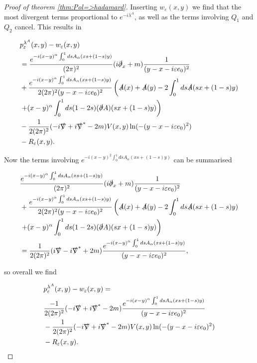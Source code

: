 \documentclass[b5paper,draft,openbib,12pt]{memoir}
\begin{document}
\begin{proof}[Proof of theorem \ref{thm:Pol=>hadamard}]
Inserting \(w_\varepsilon(x,y)\) we find that the most divergent terms proportional to \(e^{-i\lambda^A}\), as well as the terms involving \(Q_1\) and \(Q_2\) cancel.
This results in 

\begin{align*}
&p_\varepsilon^{\lambda^A}(x,y)-w_\varepsilon(x,y)\\
&=\frac{e^{-i(x-y)^\alpha \int_0^1 ds A_\alpha (xs + (1-s)y)}}{(2\pi)^2}(i\slashed{\partial}_x+m)\frac{1}{(y-x-i\varepsilon e_0)^2}\\
&+\frac{e^{-i (x-y)^\alpha\int_0^1 ds A_\alpha (x s + (1-s)y)}}{2(2\pi)^2 (y-x-i\varepsilon e_0)^2}\left( \slashed{A}(x)+\slashed{A}(y) -2 \int_0^1 ds \slashed{A}(sx +(1-s)y) \right.\\
&\left.+ (x-y)^\alpha \int_0^1 ds (1-2s)(\slashed{\partial}A)(sx + (1-s)y) \right)\\
&- \frac{1}{2(2\pi)^2} (-i\slashed{\nabla}+i\slashed{\nabla}^* -2m) V(x,y)\ln (-(y-x-i\varepsilon e_0)^2)\\
&-R_\varepsilon(x,y).
\end{align*}

Now the terms involving \(e^{-i(x-y)^2\int_0^1ds A_\alpha(xs+(1-s)y)}\) can be summarised

\begin{align*}
&\frac{e^{-i(x-y)^\alpha \int_0^1 ds A_\alpha (xs + (1-s)y)}}{(2\pi)^2}(i\slashed{\partial}_x+m)\frac{1}{(y-x-i\varepsilon e_0)^2}\\
&+\frac{e^{-i (x-y)^\alpha\int_0^1 ds A_\alpha (x s + (1-s)y)}}{2(2\pi)^2 (y-x-i\varepsilon e_0)^2}\left( \slashed{A}(x)+\slashed{A}(y) -2 \int_0^1 ds \slashed{A}(sx +(1-s)y) \right.\\
&\left.+ (x-y)^\alpha \int_0^1 ds (1-2s)(\slashed{\partial}A)(sx + (1-s)y) \right)\\
&=\frac{1}{2(2\pi)^2 }(i\slashed{\nabla}-i\slashed{\nabla}^*+2m) \frac{e^{-i (x-y)^\alpha\int_0^1 ds A_\alpha (x s + (1-s)y)}}{(y-x-i\varepsilon e_0)^2},
\end{align*}

so overall we find

\begin{align*}
&p_\varepsilon^{\lambda^A}(x,y)-w_\varepsilon(x,y)=\\
&\frac{-1}{2(2\pi)^2 }(-i\slashed{\nabla}+i\slashed{\nabla}^*-2m) \frac{e^{-i (x-y)^\alpha\int_0^1 ds A_\alpha (x s + (1-s)y)}}{(y-x-i\varepsilon e_0)^2}\\
&- \frac{1}{2(2\pi)^2} (-i\slashed{\nabla}+i\slashed{\nabla}^* -2m) V(x,y)\ln (-(y-x-i\varepsilon e_0)^2)\\
&-R_\varepsilon(x,y).
\end{align*}


\end{proof}
\end{document}
